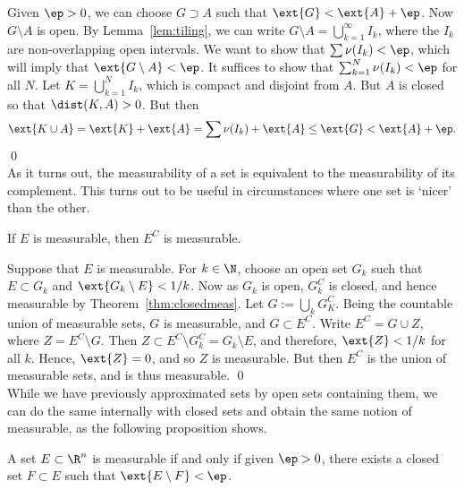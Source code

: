 \pf Given $\ep>0$, we can choose $G \supset A$ such that $\ext{G}<\ext{A}+\ep$. Now $G \setminus A$ is open. By Lemma~\ref{lem:tiling}, we can write $G\setminus A=\bigcup_{k=1}^\infty I_k$, where the $I_k$ are non-overlapping open intervals. We want to show that $\sum \nu(I_k)<\ep$, which will imply that $\ext{G \setminus A}<\ep$. It suffices to show that $\sum_{k=1}^N \nu(I_k)<\ep$ for all $N$. Let $K= \bigcup_{k=1}^N I_k$, which is compact and disjoint from $A$. But $A$ is closed so that $\dist(K,A)>0$. But then 
	\[
	\ext{K \cup A}=\ext{K}+\ext{A}= \sum \nu(I_k) + \ext{A} \leq \ext{G} < \ext{A} + \ep.
	\] \qed \\


As it turns out, the measurability of a set is equivalent to the measurability of its complement. This turns out to be useful in circumstances where one set is `nicer' than the other. 


\begin{thm}
If $E$ is measurable, then $E^C$ is measurable.
\end{thm}

\pf Suppose that $E$ is measurable. For $k \in \N$, choose an open set $G_k$ such that $E \subset G_k$ and $\ext{G_k \setminus E}<1/k$. Now as $G_k$ is open, $G_k^C$ is closed, and hence measurable by Theorem~\ref{thm:closedmeas}. Let $G:= \bigcup_k G_K^C$. Being the countable union of measurable sets, $G$ is measurable, and $G \subset E^C$. Write $E^C= G \cup Z$, where $Z= E^C \setminus G$. Then $Z \subset E^C \setminus G_k^C= G_k \setminus E$, and therefore, $\ext{Z}< 1/k$ for all $k$. Hence, $\ext{Z}=0$, and so $Z$ is measurable. But then $E^C$ is the union of measurable sets, and is thus measurable. \qed \\


While we have previously approximated sets by open sets containing them, we can do the same internally with closed sets and obtain the same notion of measurable, as the following proposition shows.


\begin{prop} \label{prop:nearclosedmeas}
A set $E \subset \R^n$ is measurable if and only if given $\ep>0$, there exists a closed set $F \subset E$ such that $\ext{E \setminus F}< \ep$. 
\end{prop}

